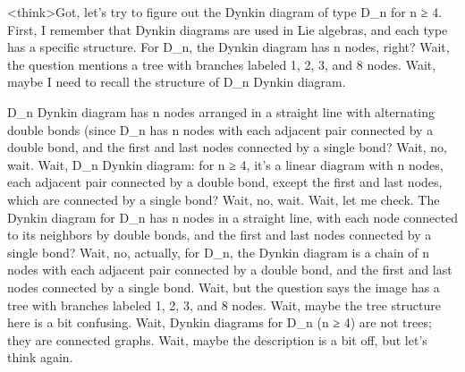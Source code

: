 <think>Got, let's try to figure out the Dynkin diagram of type D_n for n ≥ 4. First, I remember that Dynkin diagrams are used in Lie algebras, and each type has a specific structure. For D_n, the Dynkin diagram has n nodes, right? Wait, the question mentions a tree with branches labeled 1, 2, 3, and 8 nodes. Wait, maybe I need to recall the structure of D_n Dynkin diagram. 

D_n Dynkin diagram has n nodes arranged in a straight line with alternating double bonds (since D_n has n nodes with each adjacent pair connected by a double bond, and the first and last nodes connected by a single bond? Wait, no, wait. Wait, D_n Dynkin diagram: for n ≥ 4, it's a linear diagram with n nodes, each adjacent pair connected by a double bond, except the first and last nodes, which are connected by a single bond? Wait, no, wait. Wait, let me check. The Dynkin diagram for D_n has n nodes in a straight line, with each node connected to its neighbors by double bonds, and the first and last nodes connected by a single bond? Wait, no, actually, for D_n, the Dynkin diagram is a chain of n nodes with each adjacent pair connected by a double bond, and the first and last nodes connected by a single bond. Wait, but the question says the image has a tree with branches labeled 1, 2, 3, and 8 nodes. Wait, maybe the tree structure here is a bit confusing. Wait, Dynkin diagrams for D_n (n ≥ 4) are not trees; they are connected graphs. Wait, maybe the description is a bit off, but let's think again. 

